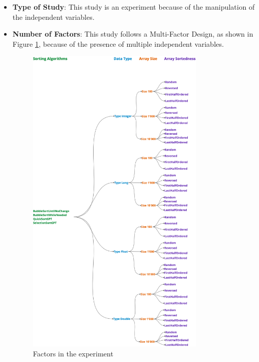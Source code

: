\documentclass[unicode,11pt,a4paper,oneside,numbers=endperiod,openany]{scrartcl}
\begin{document}
    \begin{itemize}
        
        \item \textbf{Type of Study}: This study is an experiment because of the manipulation of the independent variables.
        \item \textbf{Number of Factors}: This study follows a Multi-Factor Design, as shown in Figure \ref{fig:factors}, because of the presence of multiple independent variables.
        
        \begin{figure}[htbp]
            \centering
            \includegraphics[width=0.8\textwidth]{./fig/factors.png}
            \caption{Factors in the experiment}
            \label{fig:factors}
        \end{figure}

    \end{itemize}
\end{document}
